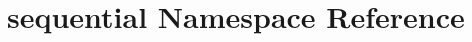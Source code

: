 \hypertarget{namespacesequential}{\section{sequential Namespace Reference}
\label{namespacesequential}
}
